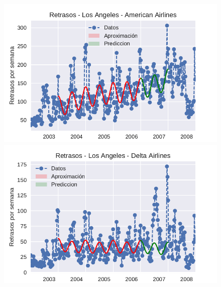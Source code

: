 \begin{figure}[H]
\centering
\begin{minipage}{.5\textwidth}
  \centering
  \includegraphics[width=1.1\linewidth]{informe/imagenes/retrasosAmericanAirlinesLA.pdf}
\end{minipage}%
\begin{minipage}{.5\textwidth}
  \centering
    \includegraphics[width=1.1\linewidth]{informe/imagenes/retrasosDeltaAirlinesLA.pdf}
\end{minipage}
\end{figure}



